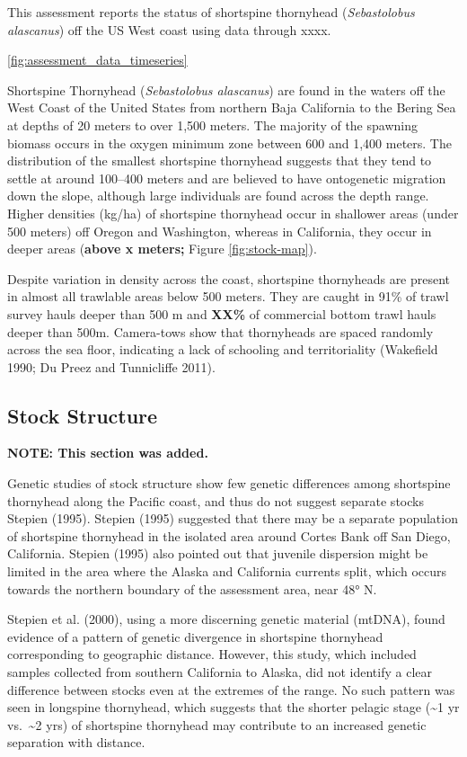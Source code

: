 \documentclass[11pt,
  english,
  letterpaper,
]{article}
\begin{document}
This assessment reports the status of shortspine thornyhead (\emph{Sebastolobus alascanus}) off the US West coast using data through xxxx.

\ref{fig:assessment_data_timeseries}

Shortspine Thornyhead (\emph{Sebastolobus alascanus}) are found in the waters off the West Coast of the United States from northern Baja California to the Bering Sea at depths of 20 meters to over 1,500 meters. The majority of the spawning biomass occurs in the oxygen minimum zone between 600 and 1,400 meters. The distribution of the smallest shortspine thornyhead suggests that they tend to settle at around 100--400 meters and are believed to have ontogenetic migration down the slope, although large individuals are found across the depth range. Higher densities (kg/ha) of shortspine thornyhead occur in shallower areas (under 500 meters) off Oregon and Washington, whereas in California, they occur in deeper areas (\textbf{above x meters;} Figure \ref{fig:stock-map}).

Despite variation in density across the coast, shortspine thornyheads are present in almost all trawlable areas below 500 meters. They are caught in 91\% of trawl survey hauls deeper than 500 m and \textbf{XX\%} of commercial bottom trawl hauls deeper than 500m. Camera-tows show that thornyheads are spaced randomly across the sea floor, indicating a lack of schooling and territoriality (Wakefield 1990; Du Preez and Tunnicliffe 2011).

\hypertarget{stock-structure}{%
\subsection{Stock Structure}\label{stock-structure}}

\textbf{NOTE: This section was added.}

Genetic studies of stock structure show few genetic differences among shortspine thornyhead along the Pacific coast, and thus do not suggest separate stocks Stepien (1995). Stepien (1995) suggested that there may be a separate population of shortspine thornyhead in the isolated area around Cortes Bank off San Diego, California. Stepien (1995) also pointed out that juvenile dispersion might be limited in the area where the Alaska and California currents split, which occurs towards the northern boundary of the assessment area, near 48° N.

Stepien et al. (2000), using a more discerning genetic material (mtDNA), found evidence of a pattern of genetic divergence in shortspine thornyhead corresponding to geographic distance. However, this study, which included samples collected from southern California to Alaska, did not identify a clear difference between stocks even at the extremes of the range. No such pattern was seen in longspine thornyhead, which suggests that the shorter pelagic stage (\textasciitilde1 yr vs.~\textasciitilde2 yrs) of shortspine thornyhead may contribute to an increased genetic separation with distance.
\end{document}
